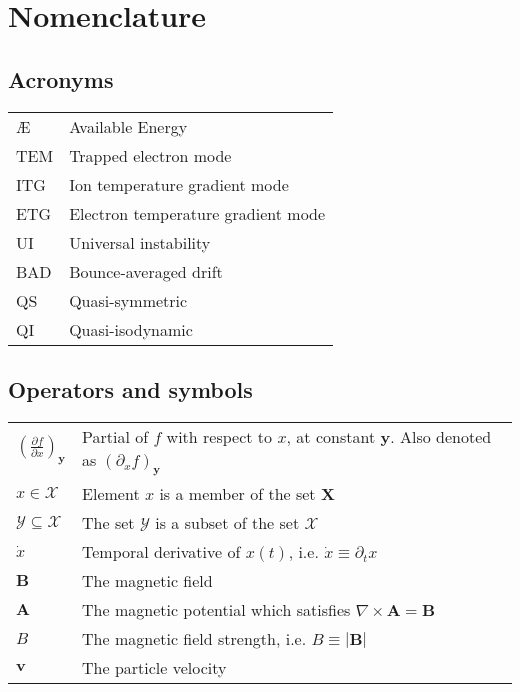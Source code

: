 \newenvironment{Nomen}
    {\vspace*{-3mm}\begin{center}
    \begin{longtable}{p{.15\textwidth} p{.83\textwidth}}
    }
    {
    \end{longtable}
    \end{center}\vspace*{-1.2cm}
    }
\newcommand{\AddSymbol}[2]{#1 & #2 \\}




\chapter*{Nomenclature}











\section*{Acronyms}

\begin{Nomen}
\AddSymbol{\AE{}}{Available Energy}
\AddSymbol{TEM}{Trapped electron mode}
\AddSymbol{ITG}{Ion temperature gradient mode}
\AddSymbol{ETG}{Electron temperature gradient mode}
\AddSymbol{UI}{Universal instability}
\AddSymbol{BAD}{Bounce-averaged drift}
\AddSymbol{QS}{Quasi-symmetric}
\AddSymbol{QI}{Quasi-isodynamic}
\end{Nomen}


\section*{Operators and  symbols}

\begin{Nomen}
\AddSymbol{$\left(\frac{\partial f}{\partial x}\right)_{\boldsymbol{y}}$}{Partial of $f$ with respect to $x$, at constant $\boldsymbol{y}$. Also denoted as $(\partial_x f)_{\boldsymbol{y}}$}
\AddSymbol{$x \in \mathcal{X}$}{Element $x$ is a member of the set $\boldsymbol{X}$}
\AddSymbol{$\mathcal{Y} \subseteq \mathcal{X}$}{The set $\mathcal{Y}$ is a subset of the set $\mathcal{X}$}
\AddSymbol{$\dot{x}$}{Temporal derivative of $x(t)$, i.e. $\dot{x} \equiv \partial_t x$}
\AddSymbol{$\boldsymbol{B}$}{The magnetic field}
\AddSymbol{$\boldsymbol{A}$}{The magnetic potential which satisfies $\nabla \times \boldsymbol{A} = \boldsymbol{B}$}
\AddSymbol{$B$}{The magnetic field strength, i.e. $B \equiv |\boldsymbol{B}|$}
\AddSymbol{$\boldsymbol{v}$}{The particle velocity}
\end{Nomen}

